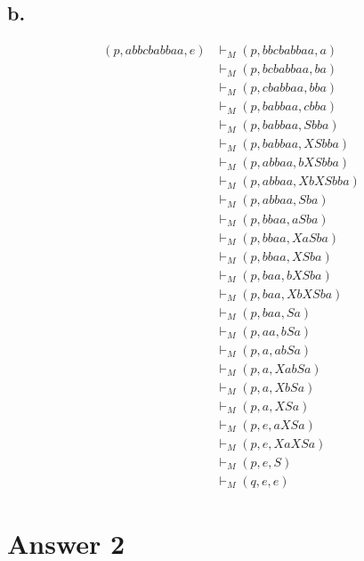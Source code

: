 \documentclass[12pt]{article}
\begin{document}
\subsection*{b.}
\begin{equation*}
\begin{split}
	(p, abbcbabbaa, e) & \vdash_M (p, bbcbabbaa,   a)\\
				       & \vdash_M (p, bcbabbaa,   ba)\\
				       & \vdash_M (p, cbabbaa,   bba)\\
				       & \vdash_M (p, babbaa,   cbba)\\
				       & \vdash_M (p, babbaa,   Sbba)\\
				       & \vdash_M (p, babbaa,  XSbba)\\
				       & \vdash_M (p, abbaa,  bXSbba)\\
				       & \vdash_M (p, abbaa, XbXSbba)\\
				       & \vdash_M (p, abbaa,     Sba)\\
				       & \vdash_M (p, bbaa,     aSba)\\
				       & \vdash_M (p, bbaa,    XaSba)\\
				       & \vdash_M (p, bbaa,     XSba)\\
				       & \vdash_M (p, baa,     bXSba)\\
				       & \vdash_M (p, baa,    XbXSba)\\
				       & \vdash_M (p, baa,        Sa)\\
				       & \vdash_M (p, aa,        bSa)\\
				       & \vdash_M (p, a,        abSa)\\
				       & \vdash_M (p, a,       XabSa)\\
				       & \vdash_M (p, a,        XbSa)\\
				       & \vdash_M (p, a,         XSa)\\
				       & \vdash_M (p, e,        aXSa)\\
				       & \vdash_M (p, e,       XaXSa)\\
				       & \vdash_M (p, e,           S)\\
				       & \vdash_M (q, e,           e)
\end{split}
\end{equation*}



\section*{Answer 2}
\end{document}
